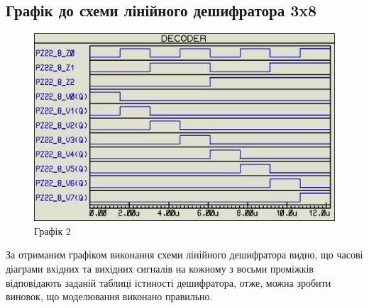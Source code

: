 \documentclass{article}
\begin{document}
\begin{normalsize}
	\section*{Графік до схеми лінійного дешифратора 3x8}
	\begin{figure}[H]
		\centering
		\includegraphics[scale=0.34]{g2}	
		\caption{Графік 2}
	\end{figure}

	За отриманим графіком виконання схеми лінійного дешифратора видно, що часові діаграми вхідних та вихідних сигналів на кожному з восьми проміжків відповідають заданій таблиці істиності дешифратора, отже, можна зробити виновок, що моделювання виконано правильно.


\end{normalsize}
\end{document}
